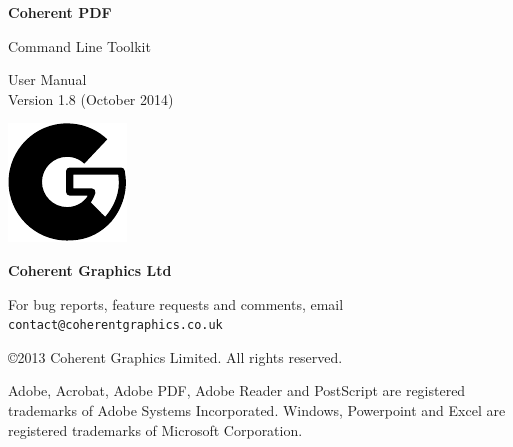 \documentclass[a4paper,makeidx]{memoir}
\newcommand{\smallgap}{\vspace{4mm}}
\begin{document}
\frontmatter
\thispagestyle{empty}

\begin{flushright}

{\sffamily \bfseries \Huge Coherent PDF

\vspace{2mm}
Command Line Toolkit}

\vspace{12mm}

{\Huge User Manual}\\
Version 1.8 (October 2014)

\vspace{25mm}

\vfill

\includegraphics{logo.pdf}

\vspace{2mm}
{\sffamily \bfseries \LARGE Coherent Graphics Ltd}

\end{flushright}

\clearpage

\thispagestyle{empty}
\noindent For bug reports, feature requests and comments, email\\ \texttt{contact@coherentgraphics.co.uk}

\vspace*{\fill}
\noindent\copyright 2013 Coherent Graphics Limited. All rights reserved.

\smallgap 
\noindent Adobe, Acrobat, Adobe PDF, Adobe Reader and PostScript are
registered trademarks of Adobe Systems Incorporated. Windows, Powerpoint and
Excel are registered trademarks of Microsoft Corporation.

\cleardoublepage
\tableofcontents

\cleardoublepage
\end{document}
